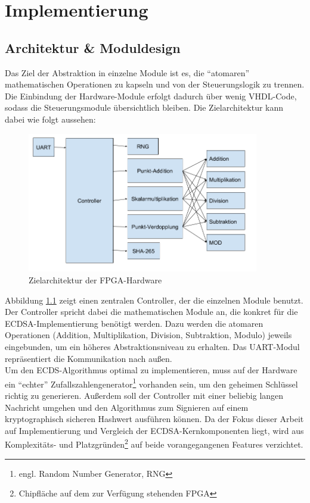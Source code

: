 
\chapter{Implementierung} \label{sec:impl}

\section{Architektur \& Moduldesign}

Das Ziel der Abstraktion in einzelne Module ist es, die ``atomaren'' mathematischen Operationen zu kapseln und von der Steuerungslogik zu trennen. Die Einbindung der Hardware-Module erfolgt dadurch über wenig VHDL-Code, sodass die Steuerungsmodule übersichtlich bleiben. Die Zielarchitektur kann dabei wie folgt aussehen: \\

\begin{figure}[H]
	\centering
  	\includegraphics[width=0.9\textwidth]{bilder/opmodules}
	\caption{Zielarchitektur der FPGA-Hardware}
	\label{fig:arch}
\end{figure}

Abbildung \ref{fig:arch} zeigt einen zentralen Controller, der die einzelnen Module benutzt. Der Controller spricht dabei die mathematischen Module an, die konkret für die ECDSA-Implementierung benötigt werden. Dazu werden die atomaren Operationen (Addition, Multiplikation, Division, Subtraktion, Modulo) jeweils eingebunden, um ein höheres Abstraktionsniveau zu erhalten. Das UART-Modul repräsentiert die Kommunikation nach außen. \\

Um den ECDS-Algorithmus optimal zu implementieren, muss auf der Hardware ein ``echter'' Zufallszahlengenerator\footnote{engl. Random Number Generator, RNG} vorhanden sein, um den geheimen Schlüssel richtig zu generieren. Außerdem soll der Controller mit einer beliebig langen Nachricht umgehen und den Algorithmus zum Signieren auf einem kryptographisch sicheren Hashwert ausführen können. Da der Fokus dieser Arbeit auf Implementierung und Vergleich der ECDSA-Kernkomponenten liegt, wird aus Komplexitäts- und Platzgründen\footnote{Chipfläche auf dem zur Verfügung stehenden FPGA} auf beide vorangegangenen Features verzichtet. \\

